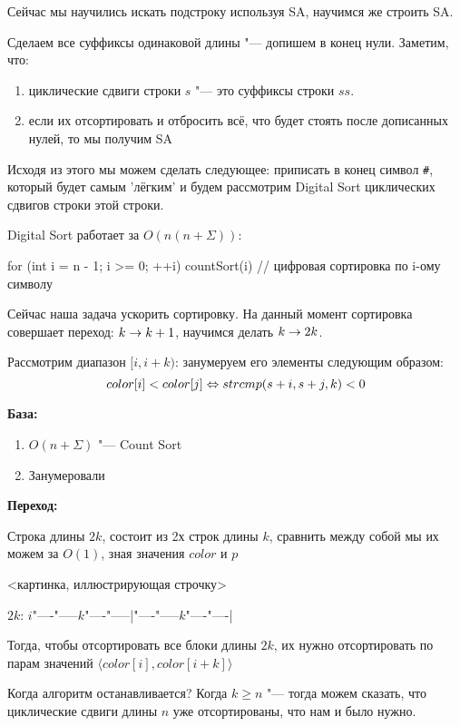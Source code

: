 Сейчас мы научились искать подстроку используя SA, научимся же строить SA.

Сделаем все суффиксы одинаковой длины "--- допишем в конец нули. Заметим, что:
\begin{enumerate}
	\item циклические сдвиги строки $s$ "--- это суффиксы строки $ss$.
	\item если их отсортировать и отбросить всё, что будет стоять после дописанных нулей, то мы получим SA
\end{enumerate}

Исходя из этого мы можем сделать следующее: приписать в конец символ \texttt{\#}, который будет самым 'лёгким'  и 
будем рассмотрим Digital Sort циклических сдвигов строки этой строки. 

Digital Sort работает за $O(n(n + \Sigma))$:
\begin{cppcode}
	for (int i = n - 1; i >= 0; ++i)
		countSort(i) // цифровая сортировка по i-ому символу
\end{cppcode}
	
Сейчас наша задача ускорить сортировку. На данный момент сортировка совершает переход: $k \rightarrow k + 1$,  научимся делать $k \rightarrow 2k$.
	
Рассмотрим диапазон $[i, i + k)$: занумеруем его элементы следующим образом:
\[ color[i] < color[j] \Leftrightarrow strcmp(s + i, s + j,  k) < 0 \]
	
\textbf{База:}

\begin{enumerate}
	\item $O(n + \Sigma)$ "--- Count Sort
	\item Занумеровали
\end{enumerate}
	
\textbf{Переход:}

	Строка длины 	$2k$, состоит из 2х строк длины $k$, сравнить между собой мы их можем за $O(1)$, зная значения $color$ и $p$
	
	<картинка, иллюстрирующая строчку>
	
	$2k$: $i$"----"-----$k$"----"-----|"----"-----$k$"----"----|
	
	Тогда, чтобы отсортировать все блоки длины $2k$, их нужно отсортировать по парам значений $\langle color[i], color[i + k] \rangle$
	
	Когда алгоритм останавливается? Когда $k \geq n$ "--- тогда можем сказать, что циклические сдвиги длины $n$ уже отсортированы, что нам и было нужно.

